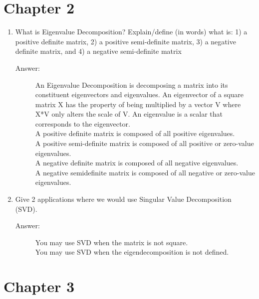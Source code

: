 \documentclass[12pt]{article}
\begin{document}
\section*{Chapter 2}

\begin{enumerate}
  \item What is Eigenvalue Decomposition? Explain/define (in words) what is: 1) a
positive definite matrix, 2) a positive semi-definite matrix, 3) a negative definite matrix, and
4) a negative semi-definite matrix
\begin{description}
 \item[Answer:] An Eigenvalue Decomposition is decomposing a matrix into its constituent eigenvectors and eigenvalues. An eigenvector of a square matrix X has the property of being multiplied by a vector V where X*V only alters the scale of V. An eigenvalue is a scalar that corresponds to the eigenvector.\\

A positive definite matrix is composed of all positive eigenvalues.\\
A positive semi-definite matrix is composed of all positive or zero-value eigenvalues.\\
A negative definite matrix is composed of all negative eigenvalues.\\
A negative semidefinite matrix is composed of all negative or zero-value eigenvalues.
\end{description}

 \item Give 2 applications where we would use Singular Value Decomposition (SVD).
\begin{description}
 \item[Answer:] You may use SVD when the matrix is not square.\\
You may use SVD when the eigendecomposition is not defined.
\end{description}
\end{enumerate}

\section*{Chapter 3}
\end{document}
